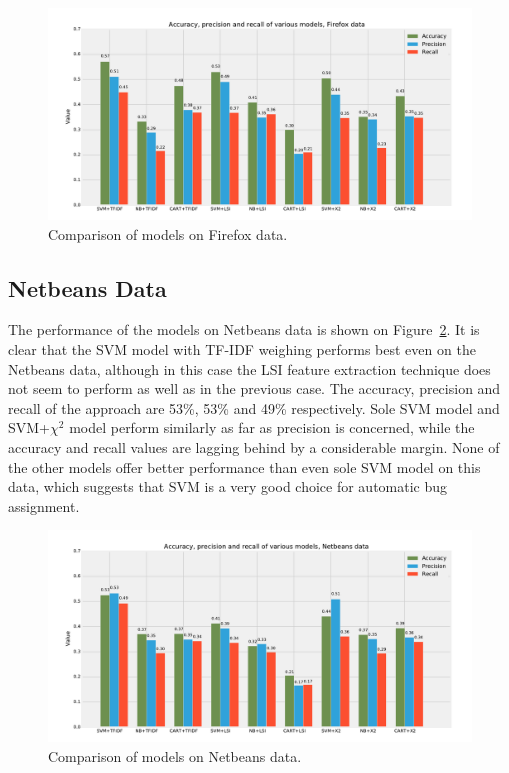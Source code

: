 \begin{figure}[htbp]
    \centering
        \includegraphics[width=\textwidth]{./images/comparison_of_models/firefox.pdf}
    \caption{Comparison of models on Firefox data.}
    \label{fig:results.models.firefox}
\end{figure}

\subsection{Netbeans Data}

The performance of the models on Netbeans data is shown on Figure~\ref{fig:results.models.netbeans}. It is clear that the SVM model with TF-IDF weighing performs best even on the Netbeans data, although in this case the LSI feature extraction technique does not seem to perform as well as in the previous case. The accuracy, precision and recall of the approach are 53\%, 53\% and 49\% respectively. Sole SVM model and SVM+$\chi^2$ model perform similarly as far as precision is concerned, while the accuracy and recall values are lagging behind by a considerable margin. None of the other models offer better performance than even sole SVM model on this data, which suggests that SVM is a very good choice for automatic bug assignment.

\begin{figure}[htbp]
    \centering
        \includegraphics[width=\textwidth]{./images/comparison_of_models/netbeans.pdf}
    \caption{Comparison of models on Netbeans data.}
    \label{fig:results.models.netbeans}
\end{figure}

